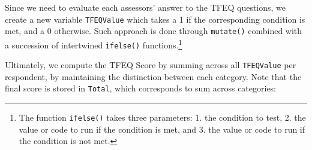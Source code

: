 \documentclass[
]{krantz}
\makeatletter
\newenvironment{Shaded}{\begin{snugshade}}{\end{snugshade}}
\newcommand{\AttributeTok}[1]{\textcolor[rgb]{0.61,0.61,0.61}{#1}}
\newcommand{\DecValTok}[1]{\textcolor[rgb]{0.06,0.06,0.06}{#1}}
\newcommand{\FunctionTok}[1]{\textcolor[rgb]{0,0,0}{#1}}
\newcommand{\NormalTok}[1]{#1}
\newcommand{\OtherTok}[1]{\textcolor[rgb]{0.37,0.37,0.37}{#1}}
\newcommand{\SpecialCharTok}[1]{\textcolor[rgb]{0,0,0}{#1}}
\newcommand{\StringTok}[1]{\textcolor[rgb]{0.5,0.5,0.5}{#1}}
\newenvironment{kframe}{%
\medskip{}
\setlength{\fboxsep}{.8em}
 \def\at@end@of@kframe{}%
 \ifinner\ifhmode%
  \def\at@end@of@kframe{\end{minipage}}%
  \begin{minipage}{\columnwidth}%
 \fi\fi%
 \def\FrameCommand##1{\hskip\@totalleftmargin \hskip-\fboxsep
 \colorbox{shadecolor}{##1}\hskip-\fboxsep
     \hskip-\linewidth \hskip-\@totalleftmargin \hskip\columnwidth}%
 \MakeFramed {\advance\hsize-\width
   \@totalleftmargin\z@ \linewidth\hsize
   \@setminipage}}%
 {\par\unskip\endMakeFramed%
 \at@end@of@kframe}
\renewenvironment{Shaded}{\begin{kframe}}{\end{kframe}}
\makeatother
\begin{document}
Since we need to evaluate each assessors' answer to the TFEQ questions, we create a new variable \texttt{TFEQValue} which takes a 1 if the corresponding condition is met, and a 0 otherwise. Such approach is done through \texttt{mutate()} combined with a succession of intertwined \texttt{ifelse()} functions.\footnote{The function \texttt{ifelse()} takes three parameters: 1. the condition to test, 2. the value or code to run if the condition is met, and 3. the value or code to run if the condition is not met.}

\begin{Shaded}
\end{Shaded}

Ultimately, we compute the TFEQ Score by summing across all \texttt{TFEQValue} per respondent, by maintaining the distinction between each category. Note that the final score is stored in \texttt{Total}, which corresponds to sum across categories:
\end{document}
